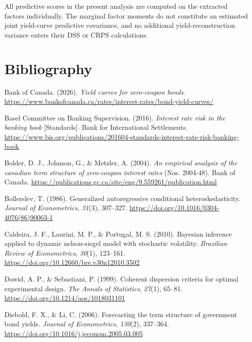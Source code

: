 \documentclass[
  12pt,
  letterpaper,
  DIV=11,
  numbers=noendperiod]{scrreprt}
\newlength{\cslhangindent}
\newenvironment{CSLReferences}[2] %
 {\begin{list}{}{%
  \setlength{\itemindent}{0pt}
  \setlength{\leftmargin}{0pt}
  \setlength{\parsep}{0pt}
  \ifodd #1
   \setlength{\leftmargin}{\cslhangindent}
   \setlength{\itemindent}{-1\cslhangindent}
  \fi
  \setlength{\itemsep}{#2\baselineskip}}}
 {\end{list}}
\begin{document}
All predictive scores in the present analysis are computed on the
extracted factors individually. The marginal factor moments do not
constitute an estimated joint yield-curve predictive covariance, and no
additional yield-reconstruction variance enters their DSS or CRPS
calculations.

\chapter*{Bibliography}\label{bibliography}

\small

\protect{}\label{refs}
\begin{CSLReferences}{1}{0}
Bank of Canada. (2026). \emph{Yield curves for zero-coupon bonds}.
\url{https://www.bankofcanada.ca/rates/interest-rates/bond-yield-curves/}

Basel Committee on Banking Supervision. (2016). \emph{Interest rate risk
in the banking book} {[}Standards{]}. Bank for International
Settlements.
\url{https://www.bis.org/publications/201604-standards-interest-rate-risk-banking-book}

Bolder, D. J., Johnson, G., \& Metzler, A. (2004). \emph{An empirical
analysis of the canadian term structure of zero-coupon interest rates}
(Nos. 2004-48). Bank of Canada.
\url{https://publications.gc.ca/site/eng/9.559261/publication.html}

Bollerslev, T. (1986). Generalized autoregressive conditional
heteroskedasticity. \emph{Journal of Econometrics}, \emph{31}(3),
307--327. \url{https://doi.org/10.1016/0304-4076(86)90063-1}

Caldeira, J. F., Laurini, M. P., \& Portugal, M. S. (2010). Bayesian
inference applied to dynamic nelson-siegel model with stochastic
volatility. \emph{Brazilian Review of Econometrics}, \emph{30}(1),
123--161. \url{https://doi.org/10.12660/bre.v30n12010.3502}

Dawid, A. P., \& Sebastiani, P. (1999). Coherent dispersion criteria for
optimal experimental design. \emph{The Annals of Statistics},
\emph{27}(1), 65--81. \url{https://doi.org/10.1214/aos/1018031101}

Diebold, F. X., \& Li, C. (2006). Forecasting the term structure of
government bond yields. \emph{Journal of Econometrics}, \emph{130}(2),
337--364. \url{https://doi.org/10.1016/j.jeconom.2005.03.005}


\end{CSLReferences}
\end{document}
